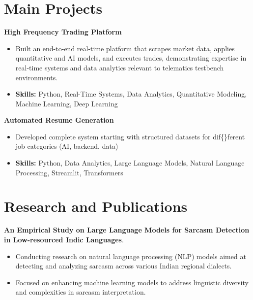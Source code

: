 \documentclass[a4paper,11pt]{article}
\begin{document}
\section{\textbf{Main Projects}}

\vspace{1mm}
  \textbf{High Frequency Trading Platform  }
\vspace{-1.5mm} %
\begin{itemize}
  \item Built an end-to-end real-time platform that scrapes market data, applies quantitative and AI models, and executes trades, demonstrating expertise in real-time systems and data analytics relevant to telematics testbench environments.
\vspace{-3mm}
  \item \textbf{Skills:} Python, Real-Time Systems, Data Analytics, Quantitative Modeling, Machine Learning, Deep Learning
\end{itemize}


\vspace{1mm}
   \textbf{Automated Resume Generation }
\vspace{-1.5mm} %
\begin{itemize}
  \item Developed complete system starting with structured datasets for dif\{\}ferent job categories (AI, backend, data)
\vspace{-3mm}
  \item \textbf{Skills:} Python, Data Analytics, Large Language Models, Natural Language Processing, Streamlit, Transformers
\end{itemize}



\section{\textbf{Research and Publications} \hfill }
\vspace{1mm}
  \textbf{An Empirical Study on Large Language Models for Sarcasm Detection in Low-resourced Indic Languages}.
\vspace{-1mm} %
\begin{itemize}
  \item Conducting research on natural language processing (NLP) models aimed at detecting and analyzing sarcasm across various Indian regional dialects.
\vspace{-3mm}
  \item Focused on enhancing machine learning models to address linguistic diversity and complexities in sarcasm interpretation.
\end{itemize}
\end{document}
